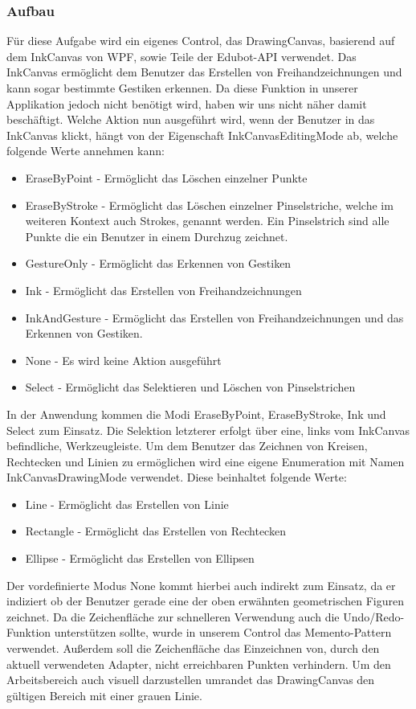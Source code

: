 \subsubsection{Aufbau}
Für diese Aufgabe wird ein eigenes Control, das DrawingCanvas, basierend auf dem InkCanvas von WPF, sowie Teile der Edubot-API verwendet. Das InkCanvas ermöglicht dem Benutzer das Erstellen von Freihandzeichnungen und kann sogar bestimmte Gestiken erkennen. Da diese Funktion in unserer Applikation jedoch nicht benötigt wird, haben wir uns nicht näher damit beschäftigt. Welche Aktion nun ausgeführt wird, wenn der Benutzer in das InkCanvas klickt, hängt von der Eigenschaft InkCanvasEditingMode ab, welche folgende Werte annehmen kann:
\begin{itemize}
\item EraseByPoint - Ermöglicht das Löschen einzelner Punkte
\item EraseByStroke - Ermöglicht das Löschen einzelner Pinselstriche, welche im weiteren Kontext auch Strokes, genannt werden. Ein Pinselstrich sind alle Punkte die ein Benutzer in einem Durchzug zeichnet.
\item GestureOnly - Ermöglicht das Erkennen von Gestiken
\item Ink - Ermöglicht das Erstellen von Freihandzeichnungen
\item InkAndGesture - Ermöglicht das Erstellen von Freihandzeichnungen und das Erkennen von Gestiken.
\item None - Es wird keine Aktion ausgeführt
\item Select - Ermöglicht das Selektieren und Löschen von Pinselstrichen
\end{itemize}
In der Anwendung kommen die Modi EraseByPoint, EraseByStroke, Ink und Select zum Einsatz. Die Selektion letzterer erfolgt über eine, links vom InkCanvas befindliche, Werkzeugleiste. Um dem Benutzer das Zeichnen von Kreisen, Rechtecken und Linien zu ermöglichen wird eine eigene Enumeration mit Namen InkCanvasDrawingMode verwendet. Diese beinhaltet folgende Werte:
\begin{itemize}
\item Line - Ermöglicht das Erstellen von Linie
\item Rectangle - Ermöglicht das Erstellen von Rechtecken
\item Ellipse - Ermöglicht das Erstellen von Ellipsen
\end{itemize}
Der vordefinierte Modus None kommt hierbei auch indirekt zum Einsatz, da er indiziert ob der Benutzer gerade eine der oben erwähnten geometrischen Figuren zeichnet. 
Da die Zeichenfläche zur schnelleren Verwendung auch die Undo/Redo-Funktion unterstützen sollte, wurde in unserem Control das Memento-Pattern verwendet. Außerdem soll die Zeichenfläche das Einzeichnen von, durch den aktuell verwendeten Adapter, nicht erreichbaren Punkten verhindern. Um den Arbeitsbereich auch visuell darzustellen umrandet das DrawingCanvas den gültigen Bereich mit einer grauen Linie.

